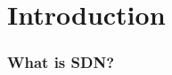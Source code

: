 \documentclass[11pt]{beamer}
\begin{document}



% 



 


% 	
% 			


\section{Introduction}
\begin{frame}
\frametitle{What is SDN?}
\end{frame}
\end{document}
